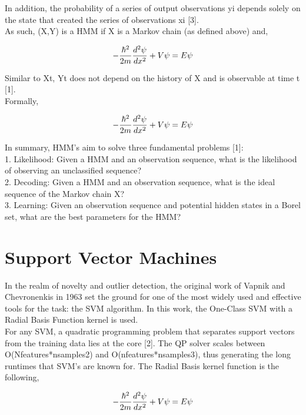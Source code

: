 \documentclass[]{hdsr}
\begin{document}
In addition, the probability of a series of output observations yi depends solely on the state that created the series of observations xi [3].
\\
As such, (X,Y) is a HMM if X is a Markov chain (as defined above) and,

\begin{equation}
-\frac{\hbar^2}{2m} \frac{d^2 \psi}{dx^2} + V\psi = E\psi\\
\end{equation}

Similar to Xt, Yt does not depend on the history of X and is observable at time t [1].\\
Formally,

\begin{equation}
-\frac{\hbar^2}{2m} \frac{d^2 \psi}{dx^2} + V\psi = E\psi\\
\end{equation}

In summary, HMM’s aim to solve three fundamental problems [1]:\\
1.	Likelihood: Given a HMM and an observation sequence, what is the likelihood of observing an unclassified sequence?\\
2.	Decoding: Given a HMM and an observation sequence, what is the ideal sequence of the Markov chain X?\\
3.	Learning: Given an observation sequence and potential hidden states in a Borel set, what are the best parameters for the HMM?\\

\section{Support Vector Machines}
\label{sec3}
In the realm of novelty and outlier detection, the original work of Vapnik and Chevronenkis in 1963 set the ground for one of the most widely used and effective tools for the task: the SVM algorithm. In this work, the One-Class SVM with a Radial Basis Function kernel is used.\\
For any SVM, a quadratic programming problem that separates support vectors from the training data lies at the core [2]. The QP solver scales between O(Nfeatures*nsamples2)  and O(nfeatures*nsamples3), thus generating the long runtimes that SVM’s are known for. The Radial Basis kernel function is the following,

\begin{equation}
-\frac{\hbar^2}{2m} \frac{d^2 \psi}{dx^2} + V\psi = E\psi\\
\end{equation}
\end{document}
